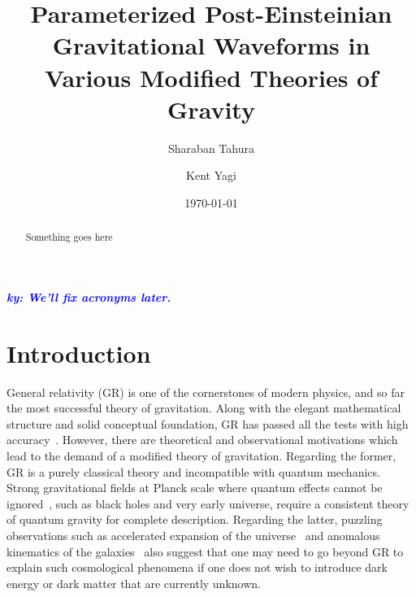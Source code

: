 \documentclass[prd,twocolumn,nofootinbib]{revtex4-1}
\newcommand{\ky}[1]{\textcolor{blue}{\it{\textbf{ky: #1}}} }
\begin{document}
\title{Parameterized Post-Einsteinian Gravitational Waveforms in \\ Various Modified Theories of Gravity}

\author{Sharaban Tahura}

\author{Kent Yagi}

\begin{abstract} 

Something goes here 

\end{abstract}

\date{\today}




\maketitle





\ky{We'll fix acronyms later.}

\section{Introduction}
General relativity (GR) is one of the cornerstones of modern physics, and so far the most  successful theory of gravitation. Along with the elegant mathematical structure and solid conceptual foundation, GR has passed all the tests with high accuracy~\cite{Will:2014kxa}. However, there are theoretical and observational motivations which lead to the demand of a modified theory of gravitation. Regarding the former, GR is a purely classical theory and incompatible with quantum mechanics. Strong gravitational fields at Planck scale where quantum effects cannot be ignored~\cite{Adler:2010wf,Ng:2003jk}, such as black holes and very early universe, require a consistent theory of quantum gravity for complete description. Regarding the latter, puzzling observations such as accelerated expansion of the universe~\cite{Abbott:1988nx,Copeland:2006wr,Perlmutter:1998np,Riess:1998cb,Riess:2004nr,RevModPhys.61.1,vanAlbada:1984js,WEINBERG201387} and anomalous kinematics of the galaxies~\cite{article,Bosma:1981zz,Begeman:1991iy,Rubin:1970zza,Rubin:1980zd,1973ApJ...186..467O,Ostriker:1993fr} also suggest that one may need to go beyond GR to explain such cosmological phenomena if one does not wish to introduce dark energy or dark matter that are currently unknown.
\end{document}
